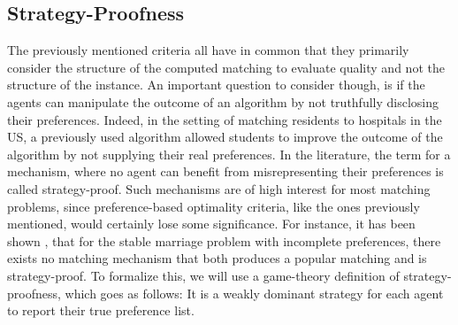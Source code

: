 \subsection{Strategy-Proofness}
The previously mentioned criteria all have in common that they primarily consider the structure of the computed matching to evaluate quality and not the structure of the instance. An important question to consider though, is if the agents can manipulate the outcome of an algorithm by not truthfully disclosing their preferences. Indeed, in the setting of matching residents to hospitals in the US, a previously used algorithm allowed students to improve the outcome of the algorithm by not supplying their real preferences.\cite{Gusfield} In the literature, the term for a mechanism, where no agent can benefit from misrepresenting their preferences is called strategy-proof. \cite{Klaus} Such mechanisms are of high interest for most matching problems, since preference-based optimality criteria, like the ones previously mentioned, would certainly lose some significance.
For instance, it has been shown \cite{ROTH1982127}, that for the stable marriage problem with incomplete preferences, there exists no matching mechanism that both produces a popular matching and is strategy-proof.
To formalize this, we will use a game-theory definition of strategy-proofness, which goes as follows: It is a weakly dominant strategy for each agent to report their true preference list. \cite{Klaus}

